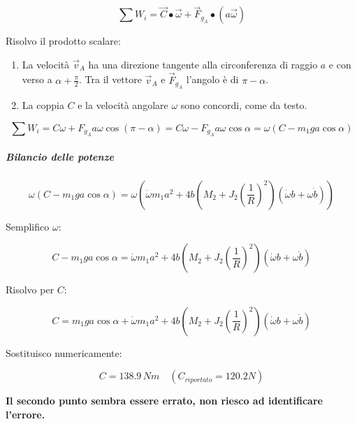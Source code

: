 \documentclass[main.tex]{subfiles}
\begin{document}
\[
	\sum W_i = \vec{C}\bullet\vec{\omega} + \vec{F}_{g_A}\bullet(a\vec{\omega})
\]

Risolvo il prodotto scalare:

\begin{enumerate}
	\item La velocità $\vec{v}_A$ ha una direzione tangente alla circonferenza di raggio $a$ e con verso a $\alpha + \frac{\pi}{2}$. Tra il vettore $\vec{v}_A$ e $\vec{F}_{g_A}$ l'angolo è di $\pi - \alpha$.
	\item La coppia $C$ e la velocità angolare $\omega$ sono concordi, come da testo.
\end{enumerate}

\[
	\sum W_i = C\omega + F_{g_A}a\omega\cos(\pi - \alpha) = C\omega - F_{g_A}a\omega\cos\alpha = \omega(C - m_1ga\cos\alpha)
\]

\subparagraph{Bilancio delle potenze}

\[
	\omega(C - m_1ga\cos\alpha) = \omega(\dot{\omega}m_1a^2 + 4b(M_2 + J_2(\frac{1}{R})^2)(\dot{\omega}b + \omega \dot{b}))
\]

Semplifico $\omega$:

\[
	C - m_1ga\cos\alpha= \dot{\omega}m_1a^2 + 4b(M_2 + J_2(\frac{1}{R})^2)(\dot{\omega}b + \omega \dot{b})
\]

Risolvo per $C$:

\[
	C = m_1ga\cos\alpha + \dot{\omega}m_1a^2 + 4b(M_2 + J_2(\frac{1}{R})^2)(\dot{\omega}b + \omega \dot{b})
\]

Sostituisco numericamente:

\[
	C = 138.9\,Nm\quad(C_{riportato} = 120.2N)
\]

\textbf{Il secondo punto sembra essere errato, non riesco ad identificare l'errore.}
\end{document}
